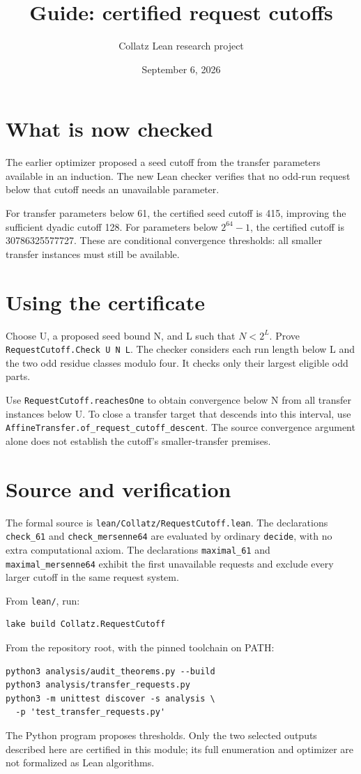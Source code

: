 \documentclass[10pt]{article}
\title{Guide: certified request cutoffs}
\author{Collatz Lean research project}
\date{September 6, 2026}
\begin{document}
\maketitle
\section*{What is now checked}
The earlier optimizer proposed a seed cutoff from the transfer parameters available in an induction. The new Lean checker verifies that no odd-run request below that cutoff needs an unavailable parameter.

For transfer parameters below 61, the certified seed cutoff is 415, improving the sufficient dyadic cutoff 128. For parameters below $2^{64}-1$, the certified cutoff is 30786325577727. These are conditional convergence thresholds: all smaller transfer instances must still be available.
\section*{Using the certificate}
Choose U, a proposed seed bound N, and L such that $N<2^L$.
Prove \texttt{RequestCutoff.Check U N L}. The checker considers each run length below L and the two odd residue classes modulo four. It checks only their largest eligible odd parts.

Use \texttt{RequestCutoff.reachesOne} to obtain convergence below N from all transfer instances below U. To close a transfer target that descends into this interval, use
\texttt{AffineTransfer.of\_request\_cutoff\_descent}.
The source convergence argument alone does not establish the cutoff's smaller-transfer premises.
\section*{Source and verification}
\raggedright
The formal source is \texttt{lean/Collatz/RequestCutoff.lean}.
The declarations \texttt{check\_61} and \texttt{check\_mersenne64} are evaluated by ordinary \texttt{decide}, with no extra computational axiom.
The declarations \texttt{maximal\_61} and \texttt{maximal\_mersenne64} exhibit the first unavailable requests and exclude every larger cutoff in the same request system.

From \texttt{lean/}, run:
\begin{verbatim}
lake build Collatz.RequestCutoff
\end{verbatim}
From the repository root, with the pinned toolchain on PATH:
\begin{verbatim}
python3 analysis/audit_theorems.py --build
python3 analysis/transfer_requests.py
python3 -m unittest discover -s analysis \
  -p 'test_transfer_requests.py'
\end{verbatim}
The Python program proposes thresholds. Only the two selected outputs described here are certified in this module; its full enumeration and optimizer are not formalized as Lean algorithms.
\end{document}
